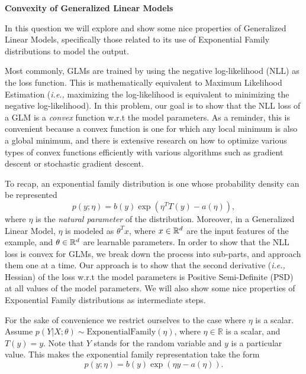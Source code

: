 \item {} {\bf Convexity of Generalized Linear Models}

In this question we will explore and show some nice properties of Generalized
Linear Models, specifically those related to its use of Exponential Family
distributions to model the output.

Most commonly, GLMs are trained by using the negative log-likelihood (NLL) as
the loss function. This is mathematically equivalent to Maximum Likelihood
Estimation (\emph{i.e.,} maximizing the log-likelihood is equivalent to
minimizing the negative log-likelihood). In this problem, our goal is to show
that the NLL loss of a GLM is a \textit{convex} function w.r.t the model parameters. As
a reminder, this is convenient because a convex function is one for which any
local minimum is also a global minimum, and there is extensive research on how
to optimize various types of convex functions efficiently with various algorithms
such as gradient descent or stochastic gradient descent. 

To recap, an exponential family distribution is one whose probability density
can be represented
%
\begin{equation*}
    p(y; \eta) = b(y)\exp(\eta^TT(y) - a(\eta)),
\end{equation*}
%
where $\eta$ is the \emph{natural parameter} of the distribution. Moreover, in
a Generalized Linear Model, $\eta$ is modeled as $\theta^Tx$, where $x \in
\mathbb{R}^{d}$ are the input features of the example, and $\theta \in
\mathbb{R}^{d}$ are learnable parameters. In order to show that the NLL loss is
convex for GLMs, we break down the process into sub-parts, and approach them
one at a time. Our approach is to show that the second derivative (\emph{i.e.,}
Hessian) of the loss w.r.t the model parameters is Positive Semi-Definite (PSD)
at all values of the model parameters. We will also show some nice properties
of Exponential Family distributions as intermediate steps.

For the sake of convenience we restrict ourselves to the case where $\eta$ is
a scalar. Assume $p(Y|X;\theta )\sim \text{ExponentialFamily}(\eta)$, where
$\eta \in\mathbb{R}$ is a scalar, and $T(y) = y$. Note that $Y$ stands for the random variable and $y$ is a particular value. This makes the exponential
family representation take the form
%
\begin{equation*}
    p(y ; \eta) = b(y)\exp(\eta y - a(\eta)).
\end{equation*}
%
\begin{enumerate}
    

\ifnum{}\fi

    

\ifnum{}\fi


    

\ifnum{}\fi


\end{enumerate}

